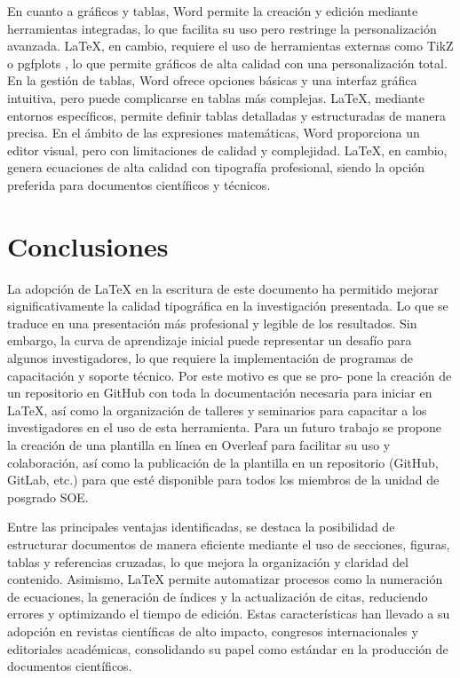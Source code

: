 \documentclass[12pt,twocolumn]{article}
\begin{document}
En cuanto a gráficos y tablas, Word permite la creación y edición mediante herramientas integradas, lo que facilita su uso pero restringe la personalización avanzada. 
LaTeX, en cambio, requiere el uso de herramientas externas como TikZ o pgfplots , lo que permite gráficos de alta calidad con una personalización total. 
En la gestión de tablas, Word ofrece opciones básicas y una interfaz gráfica intuitiva, pero puede complicarse en tablas más complejas. LaTeX, mediante entornos específicos, permite definir tablas detalladas y estructuradas de manera precisa. 
En el ámbito de las expresiones matemáticas, Word proporciona un editor visual, pero con limitaciones de calidad y complejidad. LaTeX, en cambio, genera ecuaciones de alta calidad con tipografía profesional, siendo la opción preferida para documentos científicos y técnicos.
    
    \section{Conclusiones}
    La adopción de LaTeX en la escritura de este documento ha permitido mejorar significativamente la calidad tipográfica en la investigación presentada. 
    Lo que se traduce en una presentación más profesional y legible de los resultados. Sin embargo, la curva de aprendizaje inicial puede representar un desafío para algunos investigadores, lo que requiere la implementación de programas de capacitación y soporte técnico. 
    Por este motivo es que se pro- pone la creación de un repositorio en GitHub con toda la documentación necesaria para iniciar en LaTeX, así como la organización de talleres y seminarios para capacitar a los investigadores en el uso de esta herramienta. 
    Para un futuro trabajo se propone la creación de una plantilla en línea en Overleaf para facilitar su uso y colaboración, así como la publicación de la plantilla en un repositorio (GitHub, GitLab, etc.) para que esté disponible para todos los miembros de la unidad de posgrado SOE.

    Entre las principales ventajas identificadas, se destaca la posibilidad de estructurar documentos de manera eficiente mediante el uso de secciones, figuras, tablas y referencias cruzadas, lo que mejora la organización y claridad del contenido. 
    Asimismo, LaTeX permite automatizar procesos como la numeración de ecuaciones, la generación de índices y la actualización de citas, reduciendo errores y optimizando el tiempo de edición. 
    Estas características han llevado a su adopción en revistas científicas de alto impacto, congresos internacionales y editoriales académicas, consolidando su papel como estándar en la producción de documentos científicos.
\end{document}
